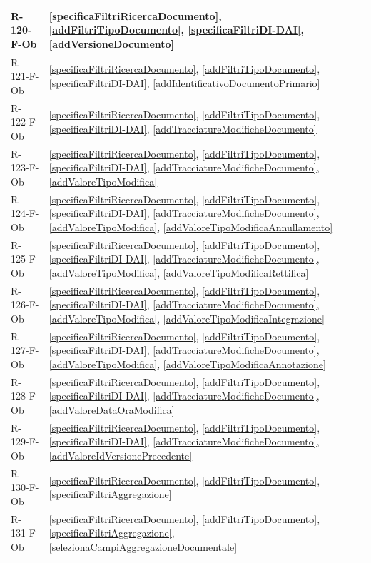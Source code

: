 \begin{longtable}{|p{4cm}|p{10cm}|}
\hline
R-120-F-Ob & \ref{specificaFiltriRicercaDocumento}, \ref{addFiltriTipoDocumento}, \ref{specificaFiltriDI-DAI}, \ref{addVersioneDocumento} \\
\hline
R-121-F-Ob & \ref{specificaFiltriRicercaDocumento}, \ref{addFiltriTipoDocumento}, \ref{specificaFiltriDI-DAI}, \ref{addIdentificativoDocumentoPrimario} \\
\hline
R-122-F-Ob & \ref{specificaFiltriRicercaDocumento}, \ref{addFiltriTipoDocumento}, \ref{specificaFiltriDI-DAI}, \ref{addTracciatureModificheDocumento} \\
\hline
R-123-F-Ob & \ref{specificaFiltriRicercaDocumento}, \ref{addFiltriTipoDocumento}, \ref{specificaFiltriDI-DAI}, \ref{addTracciatureModificheDocumento}, \ref{addValoreTipoModifica} \\
\hline
R-124-F-Ob & \ref{specificaFiltriRicercaDocumento}, \ref{addFiltriTipoDocumento}, \ref{specificaFiltriDI-DAI}, \ref{addTracciatureModificheDocumento}, \ref{addValoreTipoModifica}, \ref{addValoreTipoModificaAnnullamento} \\
\hline
R-125-F-Ob & \ref{specificaFiltriRicercaDocumento}, \ref{addFiltriTipoDocumento}, \ref{specificaFiltriDI-DAI}, \ref{addTracciatureModificheDocumento}, \ref{addValoreTipoModifica}, \ref{addValoreTipoModificaRettifica} \\
\hline
R-126-F-Ob & \ref{specificaFiltriRicercaDocumento}, \ref{addFiltriTipoDocumento}, \ref{specificaFiltriDI-DAI}, \ref{addTracciatureModificheDocumento}, \ref{addValoreTipoModifica}, \ref{addValoreTipoModificaIntegrazione} \\
\hline
R-127-F-Ob & \ref{specificaFiltriRicercaDocumento}, \ref{addFiltriTipoDocumento}, \ref{specificaFiltriDI-DAI}, \ref{addTracciatureModificheDocumento}, \ref{addValoreTipoModifica}, \ref{addValoreTipoModificaAnnotazione} \\
\hline
R-128-F-Ob & \ref{specificaFiltriRicercaDocumento}, \ref{addFiltriTipoDocumento}, \ref{specificaFiltriDI-DAI}, \ref{addTracciatureModificheDocumento}, \ref{addValoreDataOraModifica} \\
\hline
R-129-F-Ob & \ref{specificaFiltriRicercaDocumento}, \ref{addFiltriTipoDocumento}, \ref{specificaFiltriDI-DAI}, \ref{addTracciatureModificheDocumento}, \ref{addValoreIdVersionePrecedente} \\
\hline
R-130-F-Ob & \ref{specificaFiltriRicercaDocumento}, \ref{addFiltriTipoDocumento}, \ref{specificaFiltriAggregazione} \\
\hline
R-131-F-Ob & \ref{specificaFiltriRicercaDocumento}, \ref{addFiltriTipoDocumento}, \ref{specificaFiltriAggregazione}, \ref{selezionaCampiAggregazioneDocumentale} \\

\end{longtable}
